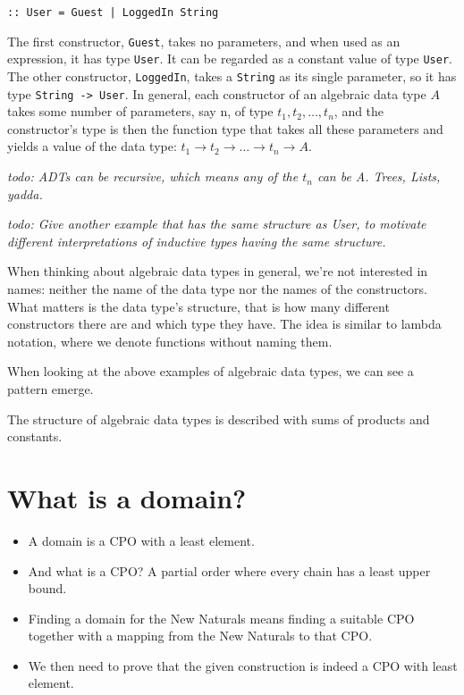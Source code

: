 \documentclass[a4paper]{article}
\newcommand{\arr}{\rightarrow}
\newcommand{\todo}[1]{\bigskip \noindent \emph{todo: #1} \bigskip}
\begin{document}
\begin{verbatim}
:: User = Guest | LoggedIn String
\end{verbatim}

The first constructor, \verb+Guest+, takes no parameters, and when used as an
expression, it has type \verb+User+.  It can be regarded as a constant value of
type \verb+User+.  The other constructor, \verb+LoggedIn+, takes a
\verb+String+ as its single parameter, so it has type \verb+String -> User+.
In general, each constructor of an algebraic data type $A$ takes some number of
parameters, say n, of type $t_1, t_2, \ldots, t_n$, and the constructor's type
is then the function type that takes all these parameters and yields a value of
the data type: $t_1 \arr t_2 \arr \ldots \arr t_n \arr A$.

\todo{ADTs can be recursive, which means any of the $t_n$ can be A. Trees,
Lists, yadda.}

\todo{Give another example that has the same structure as User, to motivate
different interpretations of inductive types having the same structure.}

When thinking about algebraic data types in general, we're not interested in
names: neither the name of the data type nor the names of the constructors.
What matters is the data type's structure, that is how many different
constructors there are and which type they have.  The idea is similar to lambda
notation, where we denote functions without naming them.

When looking at the above examples of algebraic data types, we can see a
pattern emerge.

The structure of algebraic data types is described with sums of products and
constants.

\section{What is a domain?}

\begin{itemize}
\item A domain is a CPO with a least element.
\item And what is a CPO?  A partial order where every chain has a least upper bound.

\item Finding a domain for the New Naturals means finding a suitable CPO
together with a mapping from the New Naturals to that CPO.

\item We then need to prove that the given construction is indeed a CPO with
least element.

\end{itemize}
\end{document}

